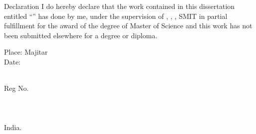 \begin{preface}{Declaration}
I do hereby declare that the work contained in this dissertation entitled ``\textbf{\textsc{\thesistitle}}'' 
has done by me, under the supervision of {\guidename},
{\guidedesignation}, {\department}, SMIT in partial fulfillment
for the award of the degree of Master of Science and
this work has not been submitted elsewhere for a degree or diploma.

\vspace*{1in}
\begin{minipage}[t]{0.4\textwidth}
\baselineskip=18pt Place: Majitar \\
\baselineskip=18pt Date: 
\end{minipage}
\begin{minipage}[t]{0.5\textwidth}
\begin{center}
    {\bf    \studentname}\\
   \baselineskip=18pt  Reg No. \regno\\
    \baselineskip=18pt  \department\\
   \baselineskip=18pt  \institute\\
   \baselineskip=18pt  \university\\
   \baselineskip=18pt  India.
\end{center}
\end{minipage}
\end{preface}